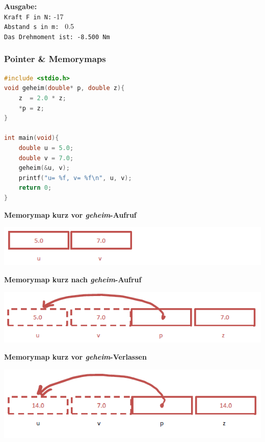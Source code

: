 			\textbf{Ausgabe:}\\
			\verb|Kraft F in N:| -17\\
			\verb|Abstand s in m: | 0.5\\
			\verb|Das Drehmoment ist: -8.500 Nm|

		\subsubsection{Pointer \& Memorymaps}
			\begin{lstlisting}[language=C]
#include <stdio.h>
void geheim(double* p, double z){
	z  = 2.0 * z;
	*p = z;
}

int main(void){
	double u = 5.0;
	double v = 7.0;
	geheim(&u, v);
	printf("u= %f, v= %f\n", u, v);
	return 0;
}
			\end{lstlisting}
			
			\textbf{Memorymap kurz vor \textit{geheim}-Aufruf}\\
				\begin{minipage}{0.9\linewidth}
					\includegraphics[width=1\linewidth]{Bilder/memmap-vor-geheim.png}
				\end{minipage}

			\textbf{Memorymap kurz nach \textit{geheim}-Aufruf}\\
				\begin{minipage}{0.9\linewidth}
					\includegraphics[width=1\linewidth]{Bilder/memmap-aufruf-geheim.png}
				\end{minipage}

			\textbf{Memorymap kurz vor \textit{geheim}-Verlassen}\\
				\begin{minipage}{0.9\linewidth}
					\includegraphics[width=1\linewidth]{Bilder/memmap-vor-verlassen.png}
				\end{minipage}

